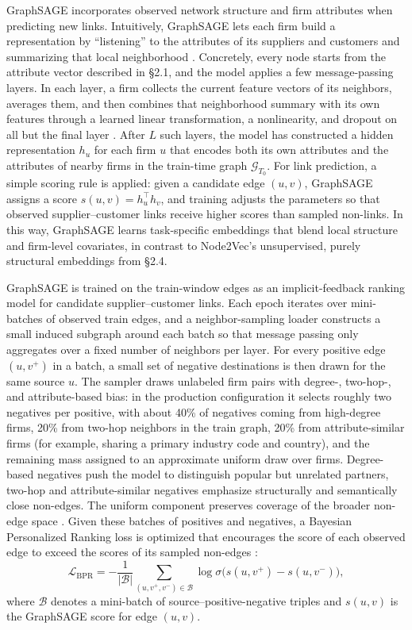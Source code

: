 GraphSAGE incorporates observed network structure and firm attributes when predicting new links. Intuitively, GraphSAGE lets each firm build a representation by ``listening'' to the attributes of its suppliers and customers and summarizing that local neighborhood \parencite{hamilton_inductive_2017,hamilton_representation_2017}. Concretely, every node starts from the attribute vector described in \S2.1, and the model applies a few message-passing layers. In each layer, a firm collects the current feature vectors of its neighbors, averages them, and then combines that neighborhood summary with its own features through a learned linear transformation, a nonlinearity, and dropout on all but the final layer \parencite{kipf_semi-supervised_2017}. After \(L\) such layers, the model has constructed a hidden representation \(h_u\) for each firm \(u\) that encodes both its own attributes and the attributes of nearby firms in the train-time graph \(\mathcal{G}_{T_0}\). For link prediction, a simple scoring rule is applied: given a candidate edge \((u,v)\), GraphSAGE assigns a score \(s(u,v) = h_u^\top h_v\), and training adjusts the parameters so that observed supplier--customer links receive higher scores than sampled non-links. In this way, GraphSAGE learns task-specific embeddings that blend local structure and firm-level covariates, in contrast to Node2Vec's unsupervised, purely structural embeddings from \S2.4.

GraphSAGE is trained on the train-window edges as an implicit-feedback ranking model for candidate supplier--customer links. Each epoch iterates over mini-batches of observed train edges, and a neighbor-sampling loader constructs a small induced subgraph around each batch so that message passing only aggregates over a fixed number of neighbors per layer. For every positive edge \((u,v^{+})\) in a batch, a small set of negative destinations is then drawn for the same source \(u\). The sampler draws unlabeled firm pairs with degree-, two-hop-, and attribute-based bias: in the production configuration it selects roughly two negatives per positive, with about 40\% of negatives coming from high-degree firms, 20\% from two-hop neighbors in the train graph, 20\% from attribute-similar firms (for example, sharing a primary industry code and country), and the remaining mass assigned to an approximate uniform draw over firms. Degree-based negatives push the model to distinguish popular but unrelated partners, two-hop and attribute-similar negatives emphasize structurally and semantically close non-edges. The uniform component preserves coverage of the broader non-edge space \parencite{mikolov_distributed_2013,rendle_bpr_2009,he_neural_2017,wang_neural_2019,yang_understanding_negative_2020}. Given these batches of positives and negatives, a Bayesian Personalized Ranking loss is optimized that encourages the score of each observed edge to exceed the scores of its sampled non-edges \parencite{rendle_bpr_2009,goodfellow_deep_2016}:
\[
\mathcal{L}_{\text{BPR}} = - \frac{1}{|\mathcal{B}|} \sum_{(u, v^+, v^-)\in \mathcal{B}} \log \sigma\!\big(s(u,v^+) - s(u,v^-)\big),
\]
where \(\mathcal{B}\) denotes a mini-batch of source--positive-negative triples and \(s(u,v)\) is the GraphSAGE score for edge \((u,v)\).

